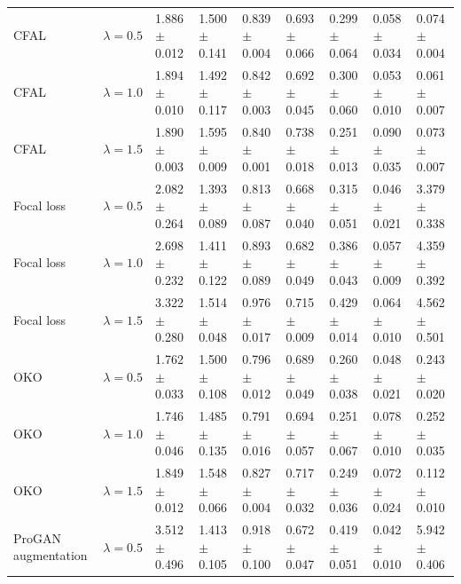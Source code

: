\begin{tabular}{lllllllll}
CFAL & $\lambda=0.5$ & \num{1.886} $\pm$ \num{0.012} & \num{1.500} $\pm$ \num{0.141} & \num{0.839} $\pm$ \num{0.004} & \num{0.693} $\pm$ \num{0.066} & \num{0.299} $\pm$ \num{0.064} & \num{0.058} $\pm$ \num{0.034} & \num{0.074} $\pm$ \num{0.004}\\
CFAL & $\lambda=1.0$ & \num{1.894} $\pm$ \num{0.010} & \num{1.492} $\pm$ \num{0.117} & \num{0.842} $\pm$ \num{0.003} & \num{0.692} $\pm$ \num{0.045} & \num{0.300} $\pm$ \num{0.060} & \num{0.053} $\pm$ \num{0.010} & \num{0.061} $\pm$ \num{0.007}\\
CFAL & $\lambda=1.5$ & \num{1.890} $\pm$ \num{0.003} & \num{1.595} $\pm$ \num{0.009} & \num{0.840} $\pm$ \num{0.001} & \num{0.738} $\pm$ \num{0.018} & \num{0.251} $\pm$ \num{0.013} & \num{0.090} $\pm$ \num{0.035} & \num{0.073} $\pm$ \num{0.007}\\
Focal loss & $\lambda=0.5$ & \num{2.082} $\pm$ \num{0.264} & \num{1.393} $\pm$ \num{0.089} & \num{0.813} $\pm$ \num{0.087} & \num{0.668} $\pm$ \num{0.040} & \num{0.315} $\pm$ \num{0.051} & \num{0.046} $\pm$ \num{0.021} & \num{3.379} $\pm$ \num{0.338}\\
Focal loss & $\lambda=1.0$ & \num{2.698} $\pm$ \num{0.232} & \num{1.411} $\pm$ \num{0.122} & \num{0.893} $\pm$ \num{0.089} & \num{0.682} $\pm$ \num{0.049} & \num{0.386} $\pm$ \num{0.043} & \num{0.057} $\pm$ \num{0.009} & \num{4.359} $\pm$ \num{0.392}\\
Focal loss & $\lambda=1.5$ & \num{3.322} $\pm$ \num{0.280} & \num{1.514} $\pm$ \num{0.048} & \num{0.976} $\pm$ \num{0.017} & \num{0.715} $\pm$ \num{0.009} & \num{0.429} $\pm$ \num{0.014} & \num{0.064} $\pm$ \num{0.010} & \num{4.562} $\pm$ \num{0.501}\\
OKO & $\lambda=0.5$ & \num{1.762} $\pm$ \num{0.033} & \num{1.500} $\pm$ \num{0.108} & \num{0.796} $\pm$ \num{0.012} & \num{0.689} $\pm$ \num{0.049} & \num{0.260} $\pm$ \num{0.038} & \num{0.048} $\pm$ \num{0.021} & \num{0.243} $\pm$ \num{0.020}\\
OKO & $\lambda=1.0$ & \num{1.746} $\pm$ \num{0.046} & \num{1.485} $\pm$ \num{0.135} & \num{0.791} $\pm$ \num{0.016} & \num{0.694} $\pm$ \num{0.057} & \num{0.251} $\pm$ \num{0.067} & \num{0.078} $\pm$ \num{0.010} & \num{0.252} $\pm$ \num{0.035}\\
OKO & $\lambda=1.5$ & \num{1.849} $\pm$ \num{0.012} & \num{1.548} $\pm$ \num{0.066} & \num{0.827} $\pm$ \num{0.004} & \num{0.717} $\pm$ \num{0.032} & \num{0.249} $\pm$ \num{0.036} & \num{0.072} $\pm$ \num{0.024} & \num{0.112} $\pm$ \num{0.010}\\
ProGAN augmentation & $\lambda=0.5$ & \num{3.512} $\pm$ \num{0.496} & \num{1.413} $\pm$ \num{0.105} & \num{0.918} $\pm$ \num{0.100} & \num{0.672} $\pm$ \num{0.047} & \num{0.419} $\pm$ \num{0.051} & \num{0.042} $\pm$ \num{0.010} & \num{5.942} $\pm$ \num{0.406}\\

\end{tabular}
